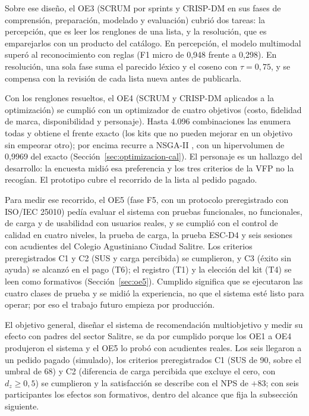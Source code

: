 Sobre ese diseño, el OE3 (SCRUM por sprints y CRISP-DM en sus fases de comprensión, preparación, modelado y evaluación) cubrió dos tareas: la percepción, que es leer los renglones de una lista, y la resolución, que es emparejarlos con un producto del catálogo. En percepción, el modelo multimodal superó al reconocimiento con reglas (F1 micro de 0,948 frente a 0,298). En resolución, una sola fase suma el parecido léxico y el coseno con $\tau=0{,}75$, y se compensa con la revisión de cada lista nueva antes de publicarla.

Con los renglones resueltos, el OE4 (SCRUM y CRISP-DM aplicados a la optimización) se cumplió con un optimizador de cuatro objetivos (costo, fidelidad de marca, disponibilidad y personaje). Hasta 4.096 combinaciones las enumera todas y obtiene el frente exacto (los kits que no pueden mejorar en un objetivo sin empeorar otro); por encima recurre a NSGA-II \citep{deb_fast_2002,blank_pymoo_2020}, con un hipervolumen de 0,9969 del exacto (Sección~\ref{sec:optimizacion-cal}). El personaje es un hallazgo del desarrollo: la encuesta midió esa preferencia y los tres criterios de la VFP no la recogían. El prototipo cubre el recorrido de la lista al pedido pagado.

Para medir ese recorrido, el OE5 (fase F5, con un protocolo preregistrado con ISO/IEC 25010) pedía evaluar el sistema con pruebas funcionales, no funcionales, de carga y de usabilidad con usuarios reales, y se cumplió con el control de calidad en cuatro niveles, la prueba de carga, la prueba ESC-D4 y seis sesiones con acudientes del Colegio Agustiniano Ciudad Salitre. Los criterios preregistrados C1 y C2 (SUS y carga percibida) se cumplieron, y C3 (éxito sin ayuda) se alcanzó en el pago (T6); el registro (T1) y la elección del kit (T4) se leen como formativos (Sección~\ref{sec:oe5}). Cumplido significa que se ejecutaron las cuatro clases de prueba y se midió la experiencia, no que el sistema esté listo para operar; por eso el trabajo futuro empieza por producción.

El objetivo general, diseñar el sistema de recomendación multiobjetivo y medir su efecto con padres del sector Salitre, se da por cumplido porque los OE1 a OE4 produjeron el sistema y el OE5 lo probó con acudientes reales. Los seis llegaron a un pedido pagado (simulado), los criterios preregistrados C1 (SUS de 90, sobre el umbral de 68) y C2 (diferencia de carga percibida que excluye el cero, con $d_z \ge 0{,}5$) se cumplieron y la satisfacción se describe con el NPS de $+83$; con seis participantes los efectos son formativos, dentro del alcance que fija la subsección siguiente.

